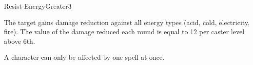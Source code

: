 \begin{spellsection}{Resist Energy}{Greater}{3}
\begin{spellheader}
\end{spellheader}
\begin{spellcontent}
    \begin{spelltargetinginfo}
    \end{spelltargetinginfo}
    \begin{spelleffects}
        \spelleffect The target gains damage reduction against all energy types (acid, cold, electricity, fire). The value of the damage reduced each round is equal to 12  per caster level above 6th.
        \spelldur \durpersonallong
    \end{spelleffects}
\end{spellcontent}
\begin{spellfooter}
    \spellnotes A character can only be affected by one  spell at once.
\end{spellfooter}
\end{spellsection}

